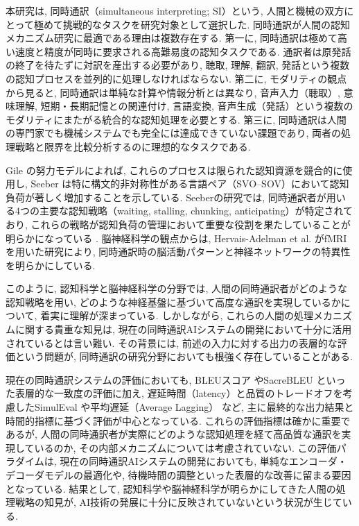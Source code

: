 本研究は, 同時通訳（simultaneous interpreting; SI）という, 人間と機械の双方にとって極めて挑戦的なタスクを研究対象として選択した. 
同時通訳が人間の認知メカニズム研究に最適である理由は複数存在する. 
第一に, 同時通訳は極めて高い速度と精度が同時に要求される高難易度の認知タスクである. 
通訳者は原発話の終了を待たずに対訳を産出する必要があり, 聴取, 理解, 翻訳, 発話という複数の認知プロセスを並列的に処理しなければならない. 
第二に, モダリティの観点から見ると, 同時通訳は単純な計算や情報分析とは異なり, 音声入力（聴取）, 意味理解, 短期・長期記憶との関連付け, 言語変換, 音声生成（発話）という複数のモダリティにまたがる統合的な認知処理を必要とする. 
第三に, 同時通訳は人間の専門家でも機械システムでも完全には達成できていない課題であり, 両者の処理戦略と限界を比較分析するのに理想的なタスクである. 

Gile \cite{gile1995regards} の努力モデルによれば, これらのプロセスは限られた認知資源を競合的に使用し, Seeber \cite{seeber2011cognitive} は特に構文的非対称性がある言語ペア（SVO--SOV）において認知負荷が著しく増加することを示している. 
Seeberの研究では, 同時通訳者が用いる4つの主要な認知戦略（waiting, stalling, chunking, anticipating）が特定されており, これらの戦略が認知負荷の管理において重要な役割を果たしていることが明らかになっている \cite{seeber2011cognitive}. 
脳神経科学の観点からは, Hervais-Adelman et al. \cite{hervais2017cortical} がfMRIを用いた研究により, 同時通訳時の脳活動パターンと神経ネットワークの特異性を明らかにしている. 

このように, 認知科学と脳神経科学の分野では, 人間の同時通訳者がどのような認知戦略を用い, どのような神経基盤に基づいて高度な通訳を実現しているかについて, 着実に理解が深まっている. 
しかしながら, これらの人間の処理メカニズムに関する貴重な知見は, 現在の同時通訳AIシステムの開発において十分に活用されているとは言い難い. 
その背景には, 前述の入力に対する出力の表層的な評価という問題が, 同時通訳の研究分野においても根強く存在していることがある. 

現在の同時通訳システムの評価においても, BLEUスコア \cite{papineni2002bleu} やSacreBLEU \cite{post2018call} といった表層的な一致度の評価に加え, 遅延時間（latency）と品質のトレードオフを考慮したSimulEval \cite{ma2020simuleval} や平均遅延（Average Lagging） \cite{ma2019stacl} など, 主に最終的な出力結果と時間的指標に基づく評価が中心となっている. 
これらの評価指標は確かに重要であるが, 人間の同時通訳者が実際にどのような認知処理を経て高品質な通訳を実現しているのか, その内部メカニズムについては考慮されていない. 
この評価パラダイムは, 現在の同時通訳AIシステムの開発においても, 単純なエンコーダ・デコーダモデルの最適化や, 待機時間の調整といった表層的な改善に留まる要因となっている. 
結果として, 認知科学や脳神経科学が明らかにしてきた人間の処理戦略の知見が, AI技術の発展に十分に反映されていないという状況が生じている. 

